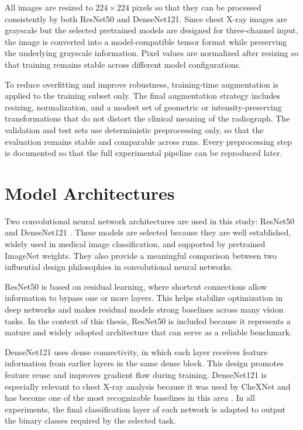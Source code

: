 All images are resized to $224 \times 224$ pixels so that they can be processed consistently by both ResNet50 and DenseNet121. Since chest X-ray images are grayscale but the selected pretrained models are designed for three-channel input, the image is converted into a model-compatible tensor format while preserving the underlying grayscale information. Pixel values are normalized after resizing so that training remains stable across different model configurations.

To reduce overfitting and improve robustness, training-time augmentation is applied to the training subset only. The final augmentation strategy includes resizing, normalization, and a modest set of geometric or intensity-preserving transformations that do not distort the clinical meaning of the radiograph. The validation and test sets use deterministic preprocessing only, so that the evaluation remains stable and comparable across runs. Every preprocessing step is documented so that the full experimental pipeline can be reproduced later.

\section{Model Architectures}
Two convolutional neural network architectures are used in this study: ResNet50 \cite{ref:he2016} and DenseNet121 \cite{ref:huang2017}. These models are selected because they are well established, widely used in medical image classification, and supported by pretrained ImageNet weights. They also provide a meaningful comparison between two influential design philosophies in convolutional neural networks.

ResNet50 is based on residual learning, where shortcut connections allow information to bypass one or more layers. This helps stabilize optimization in deep networks and makes residual models strong baselines across many vision tasks. In the context of this thesis, ResNet50 is included because it represents a mature and widely adopted architecture that can serve as a reliable benchmark.

DenseNet121 uses dense connectivity, in which each layer receives feature information from earlier layers in the same dense block. This design promotes feature reuse and improves gradient flow during training. DenseNet121 is especially relevant to chest X-ray analysis because it was used by CheXNet and has become one of the most recognizable baselines in this area \cite{ref:rajpurkar2017}. In all experiments, the final classification layer of each network is adapted to output the binary classes required by the selected task.

